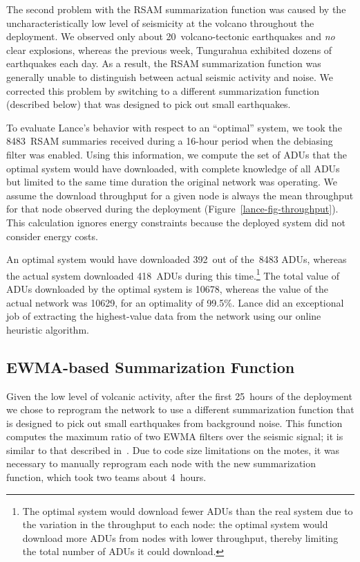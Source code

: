 The second problem with the RSAM summarization function was caused by the
uncharacteristically low level of seismicity at the volcano throughout the
deployment. We observed only about 20~volcano-tectonic earthquakes and
\textit{no} clear explosions, whereas the previous week, Tungurahua exhibited
dozens of earthquakes each day. As a result, the RSAM summarization function
was generally unable to distinguish between actual seismic activity and
noise. We corrected this problem by switching to a different summarization
function (described below) that was designed to pick out small earthquakes.

To evaluate Lance's behavior with respect to an ``optimal'' system, we took
the 8483~RSAM summaries received during a 16-hour period when the debiasing
filter was enabled. Using this information, we compute the set of ADUs that
the optimal system would have downloaded, with complete knowledge of all ADUs
but limited to the same time duration the original network was operating. We
assume the download throughput for a given node is always the mean throughput
for that node observed during the deployment
(Figure~\ref{lance-fig-throughput}). This calculation ignores energy
constraints because the deployed system did not consider energy costs.

An optimal system would have downloaded 392~out of the~8483 ADUs, whereas the
actual system downloaded 418~ADUs during this time.\footnote{The optimal
system would download fewer ADUs than the real system due to the variation in
the throughput to each node: the optimal system would download more ADUs from
nodes with lower throughput, thereby limiting the total number of ADUs it
could download.} The total value of ADUs downloaded by the optimal system is
10678, whereas the value of the actual network was 10629, for an optimality
of 99.5\%. Lance did an exceptional job of extracting the highest-value data
from the network using our online heuristic algorithm.

\subsection{EWMA-based Summarization Function}
\label{lance-sec-ewma-deployment}

Given the low level of volcanic activity, after the first 25~hours of the
deployment we chose to reprogram the network to use a different summarization
function that is designed to pick out small earthquakes from background
noise. This function computes the maximum ratio of two EWMA filters over the
seismic signal; it is similar to that described in~\cite{volcano-osdi06}. Due
to code size limitations on the motes, it was necessary to manually reprogram
each node with the new summarization function, which took two teams about
4~hours.

